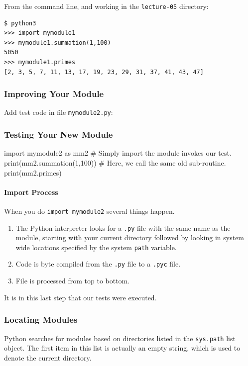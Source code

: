 \documentclass[12pt,letterpaper,twoside]{article}
\begin{document}
\begin{enumerate}
From the command line, and working in the \texttt{lecture-05} directory:

\begin{verbatim}
$ python3
>>> import mymodule1
>>> mymodule1.summation(1,100)
5050
>>> mymodule1.primes
[2, 3, 5, 7, 11, 13, 17, 19, 23, 29, 31, 37, 41, 43, 47]
\end{verbatim}

\subsubsection{Improving Your Module}

Add test code in file \texttt{mymodule2.py}:



\subsubsection{Testing Your New Module}

\begin{python}
import mymodule2 as mm2      # Simply import the module invokes our test.
print(mm2.summation(1,100))  # Here, we call the same old sub-routine.
print(mm2.primes)            
\end{python}

\paragraph{Import Process} 
When you do \texttt{import mymodule2} several things happen.

\begin{enumerate}
\def\labelenumi{\arabic{enumi}.}
\item
  The Python interpreter looks for a \texttt{.py} file with the same name as
  the module, starting with your current directory followed by looking
  in system wide locations specified by the system \texttt{path} variable.
\item
  Code is byte compiled from the \texttt{.py} file to a \texttt{.pyc}
  file.
\item
  File is processed from top to bottom.
\end{enumerate}

It is in this last step that our tests were executed.

\subsubsection{Locating Modules}
Python searches for modules based on directories listed in the 
\texttt{sys.path} list object. The first item in this list is actually an empty string,
which is used to denote the current directory.


\end{enumerate}
\end{document}
